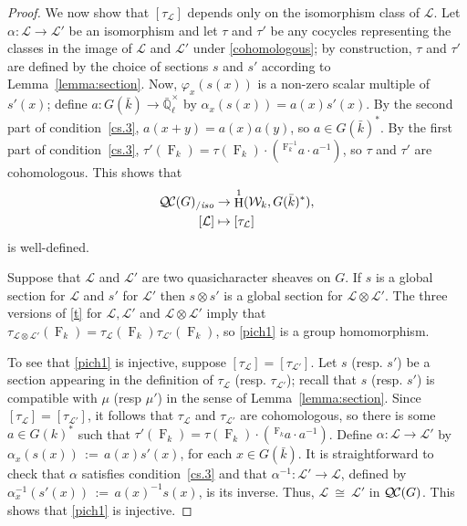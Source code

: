 \documentclass[11pt]{amsart}
\theoremstyle{plain}
\theoremstyle{definition}
\theoremstyle{remark}
\newcommand{\EE}{\mathbb{\bar Q}_\ell}
\newcommand{\bFq}{\bar{k}}
\newcommand{\Fq}{k}
\newcommand{\EEx}{\EE^\times}
\newcommand{\Frob}[1]{\operatorname{F}_{#1}}
\DeclareMathOperator{\Hh}{H}
\newcommand{\ceq}{{\, :=\, }}
\newcommand{\iso}{{\ \cong\ }}
\newcommand{\qcs}[1]{{\mathcal{#1}}}
\newcommand{\QC}{{\mathcal{Q\hskip-0.8pt C}}}
\newcommand{\QCiso}[1]{\QC(#1)_{/\textit{iso}}}
\newcommand{\Weil}[1]{\mathcal{W}_{#1}}
\newcommand\Clifton[1]{\marginpar{\smaller\smaller CC: #1}}
\begin{document}
\begin{proof}
  We now show that $[\tau_\qcs{L}]$ depends only on the isomorphism class of $\qcs{L}$.
  Let $\alpha : \qcs{L} \to \qcs{L'}$ be an isomorphism and
  let $\tau$ and $\tau'$ be any cocycles representing the classes in the
  image of $\qcs{L}$ and $\qcs{L'}$ under \eqref{cohomologous}; by construction,
  $\tau$ and $\tau'$ are defined by the choice of sections $s$ and $s'$ 
  according to Lemma~\ref{lemma:section}.
    Now, $\varphi_x(s(x))$ is a
  non-zero scalar multiple of $s'(x)$; define $a: G(\bFq) \to \EEx$
  by $\alpha_x(s(x)) = a(x) s'(x)$.
  By the second part of condition~\ref{cs.3},
  $a(x+y) = a(x)a(y)$, so $a \in G(\bFq)^*$. By the first part of
  condition~\ref{cs.3}, $\tau'(\Frob{\Fq}) = \tau(\Frob{\Fq}) \cdot (\,^{\Frob{\Fq}^{-1}}a \cdot a^{-1})$,
  so $\tau$ and $\tau'$ are cohomologous. This shows that
  \begin{equation}\label{pich1}
  \begin{split}
    \QCiso{G} &\to \Hh^1(\Weil{\Fq},G(\bFq)^*),\\
    [\qcs{L}] &\mapsto [\tau_\qcs{L}]
  \end{split}
  \end{equation}
  is well-defined.
  
    Suppose that $\qcs{L}$ and $\qcs{L}'$ are two quasicharacter sheaves on $G$.
  If $s$ is a global section for $\qcs{L}$ and $s'$ for $\qcs{L}'$ then $s \otimes s'$
  is a global section for $\qcs{L} \otimes\qcs{L}'$.  The three versions of \eqref{t}
  for $\qcs{L}, \qcs{L'}$ and $\qcs{L} \otimes\qcs{L}'$ imply that
  $\tau_{\qcs{L} \otimes\qcs{L}'}(\Frob{k}) = \tau_\qcs{L}(\Frob{k}) \tau_{\qcs{L}'}(\Frob{k})$,
  so \eqref{pich1} is a group homomorphism.
 
 
 To see that \eqref{pich1} is injective,
 suppose $[\tau_\qcs{L}] = [\tau_\qcs{L'}]$.
 Let $s$ (resp. $s'$) be a section appearing in the definition of $\tau_\qcs{L}$ (resp. $\tau_\qcs{L'}$);
 recall that $s$ (resp. $s'$) is compatible with $\mu$ (resp $\mu'$) 
 in the sense of Lemma~\ref{lemma:section}.
 Since $[\tau_\qcs{L}] = [\tau_\qcs{L'}]$, 
 it follows that $\tau_\qcs{L}$ and $\tau_{\qcs{L'}}$ are cohomologous, 
  so there is some $a\in G(\Fq)^*$ such that 
  $\tau'(\Frob{\Fq}) = \tau(\Frob{\Fq}) \cdot (\,^{\Frob{\Fq}}a \cdot a^{-1})$. 
  Define $\alpha : \qcs{L}\to \qcs{L'}$ by $\alpha_x(s(x)) \ceq a(x) s'(x)$, for each $x\in G(\bFq)$.
  It is straightforward to check that $\alpha$ satisfies condition~\ref{cs.3}
  and that $\alpha^{-1} : \qcs{L'}\to \qcs{L}$, defined by $\alpha^{-1}_x(s'(x)) \ceq a(x)^{-1} s(x)$, 
  is its inverse. Thus, $\qcs{L} \iso \qcs{L'}$ in $\QC(G)$. 
  This shows that \eqref{pich1} is injective.
  


\end{proof}
\end{document}
